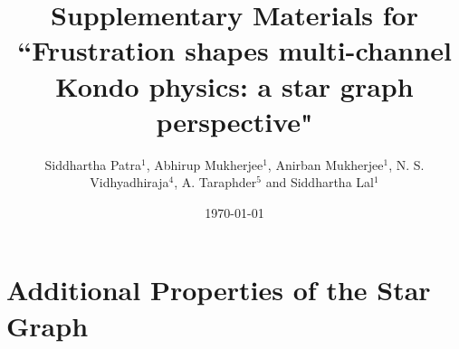 \documentclass[10pt]{iopart}
\begin{document}
\title{Supplementary Materials for ``Frustration shapes multi-channel Kondo physics: a star graph perspective"}

\author{Siddhartha Patra$^1$, Abhirup Mukherjee$^1$, Anirban Mukherjee$^1$, N. S. Vidhyadhiraja$^4$, A. Taraphder$^5$ and Siddhartha Lal$^1$}

\address{$^1$Department of Physical Sciences, Indian Institute of Science Education and Research-Kolkata, W.B. 741246, India}

\address{$^4$Theoretical Sciences Unit, Jawaharlal Nehru Center for Advanced Scientific Research, Jakkur, Bengaluru 560064, India}

\address{$^5$Department of Physics, Indian Institute of Technology Kharagpur, Kharagpur 721302, India}

\date{\today}

\section{Additional Properties of the Star Graph}
\end{document}
